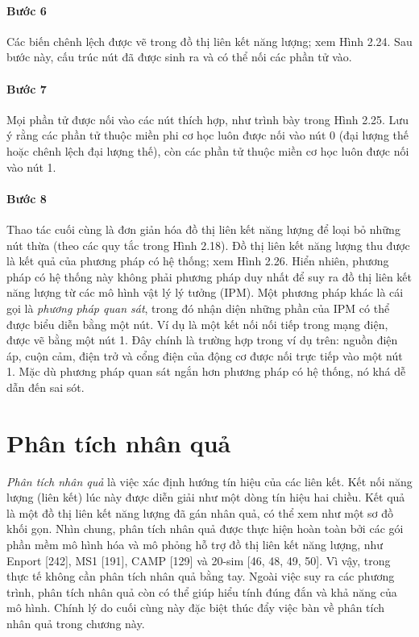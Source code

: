 \paragraph{Bước 6}
Các biến chênh lệch được vẽ trong đồ thị liên kết năng lượng; xem Hình 2.24. Sau bước này, cấu trúc nút đã được sinh ra và có thể nối các phần tử vào.

\paragraph{Bước 7}
Mọi phần tử được nối vào các nút thích hợp, như trình bày trong Hình 2.25. Lưu ý rằng các phần tử thuộc miền phi cơ học luôn được nối vào nút 0 (đại lượng thế hoặc chênh lệch đại lượng thế), còn các phần tử thuộc miền cơ học luôn được nối vào nút 1.

\paragraph{Bước 8}
Thao tác cuối cùng là đơn giản hóa đồ thị liên kết năng lượng để loại bỏ những nút thừa (theo các quy tắc trong Hình 2.18). Đồ thị liên kết năng lượng thu được là kết quả của phương pháp có hệ thống; xem Hình 2.26. Hiển nhiên, phương pháp có hệ thống này không phải phương pháp duy nhất để suy ra đồ thị liên kết năng lượng từ các mô hình vật lý lý tưởng (IPM). Một phương pháp khác là cái gọi là \emph{phương pháp quan sát}, trong đó nhận diện những phần của IPM có thể được
biểu diễn bằng một nút. Ví dụ là một kết nối nối tiếp trong mạng điện, được vẽ bằng một nút 1. Đây chính là trường hợp trong ví dụ trên: nguồn điện áp, cuộn cảm, điện trở và cổng điện của động cơ được nối trực tiếp vào một nút 1. Mặc dù phương pháp quan sát ngắn hơn phương pháp có hệ thống, nó khá dễ dẫn đến sai sót.
\section{Phân tích nhân quả}
\emph{Phân tích nhân quả} là việc xác định hướng tín hiệu của các liên kết. Kết nối năng lượng (liên kết) lúc này được diễn giải như một dòng tín hiệu hai chiều. Kết quả là một đồ thị liên kết năng lượng đã gán nhân quả, có thể xem như một sơ đồ khối gọn. Nhìn chung, phân tích nhân quả được thực hiện hoàn toàn bởi các gói phần mềm mô hình hóa và mô phỏng hỗ trợ đồ thị liên kết năng lượng, như Enport [242], MS1 [191], CAMP [129] và 20-sim [46, 48, 49, 50]. Vì vậy, trong thực tế không cần phân tích nhân quả bằng tay. Ngoài việc suy ra các phương trình, phân tích nhân quả còn có thể giúp hiểu tính đúng đắn và khả năng của mô hình. Chính lý do cuối cùng này đặc biệt thúc đẩy việc bàn về phân tích nhân quả trong chương này.

